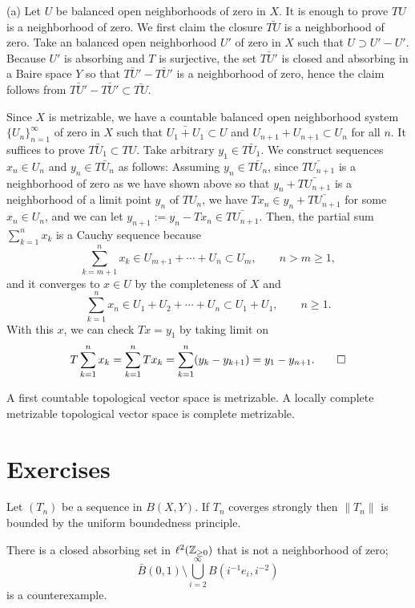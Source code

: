 \documentclass{../../large}
\begin{document}
\begin{pf}
(a)
Let $U$ be balanced open neighborhoods of zero in $X$.
It is enough to prove $TU$ is a neighborhood of zero.
We first claim the closure $\bar{TU}$ is a neighborhood of zero.
Take an balanced open neighborhood $U'$ of zero in $X$ such that $U\supset U'-U'$.
Because $U'$ is absorbing and $T$ is surjective, the set $\bar{TU'}$ is closed and absorbing in a Baire space $Y$ so that $\bar{TU'}-\bar{TU'}$ is a neighborhood of zero, hence the claim follows from $\bar{TU'}-\bar{TU'}\subset\bar{TU}$.

Since $X$ is metrizable, we have a countable balanced open neighborhood system $\{U_n\}_{n=1}^\infty$ of zero in $X$ such that $\bar{U_1+U_1}\subset U$ and $U_{n+1}+U_{n+1}\subset U_n$ for all $n$.
It suffices to prove $\bar{TU_1}\subset TU$.
Take arbitrary $y_1\in\bar{TU_1}$.
We construct sequences $x_n\in U_n$ and $y_n\in\bar{TU_n}$ as follows:
Assuming $y_n\in\bar{TU_n}$, since $\bar{TU_{n+1}}$ is a neighborhood of zero as we have shown above so that $y_n+\bar{TU_{n+1}}$ is a neighborhood of a limit point $y_n$ of $TU_n$, we have $Tx_n\in y_n+\bar{TU_{n+1}}$ for some $x_n\in U_n$, and we can let $y_{n+1}:=y_n-Tx_n\in\bar{TU_{n+1}}$.
Then, the partial sum $\sum_{k=1}^nx_k$ is a Cauchy sequence because
\[\sum_{k=m+1}^nx_k\in U_{m+1}+\cdots+U_n\subset U_m,\qquad n>m\ge1,\]
and it converges to $x\in U$ by the completeness of $X$ and
\[\sum_{k=1}^nx_n\in U_1+U_2+\cdots+U_n\subset U_1+U_1,\qquad n\ge1.\]
With this $x$, we can check $Tx=y_1$ by taking limit on
\[T\sum_{k=1}^nx_k=\sum_{k=1}^nTx_k=\sum_{k=1}^n(y_k-y_{k+1})=y_1-y_{n+1}.\qedhere\]
\end{pf}

A first countable topological vector space is metrizable.
A locally complete metrizable topological vector space is complete metrizable.


\section*{Exercises}

\begin{prb}
Let $(T_n)$ be a sequence in $B(X,Y)$.
If $T_n$ coverges strongly then $\|T_n\|$ is bounded by the uniform boundedness principle.
\end{prb}

\begin{prb}
There is a closed absorbing set in $\ell^2(\mathbb{Z}_{\ge0})$ that is not a neighborhood of zero;
\[\bar B(0,1)\setminus\bigcup_{i=2}^\infty B(i^{-1}e_i,i^{-2})\]
is a counterexample.
\end{prb}
\end{document}
